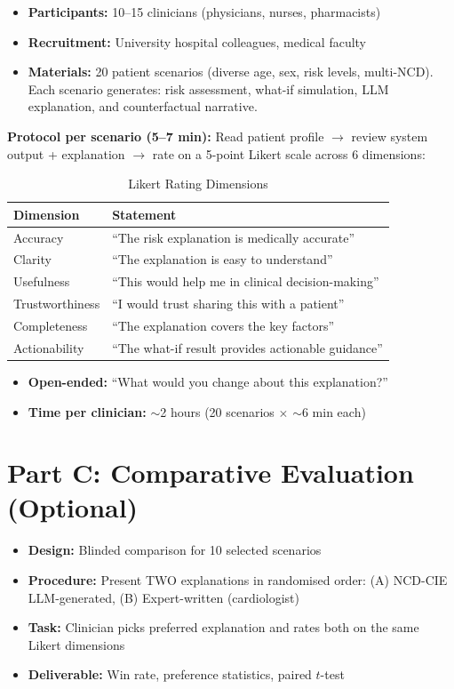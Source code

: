 \documentclass[runningheads,a4paper]{llncs}
\begin{document}
\begin{itemize}[leftmargin=*]
  \item \textbf{Participants:} 10--15 clinicians (physicians, nurses, pharmacists)
  \item \textbf{Recruitment:} University hospital colleagues, medical faculty
  \item \textbf{Materials:} 20 patient scenarios (diverse age, sex, risk levels, multi-NCD). Each scenario generates: risk assessment, what-if simulation, LLM explanation, and counterfactual narrative.
\end{itemize}

\noindent\textbf{Protocol per scenario (5--7 min):} Read patient profile $\rightarrow$ review system output + explanation $\rightarrow$ rate on a 5-point Likert scale across 6 dimensions:

\begin{table}[h]
\centering
\caption{Likert Rating Dimensions}
\begin{tabular}{ll}
\toprule
\textbf{Dimension} & \textbf{Statement} \\
\midrule
Accuracy & ``The risk explanation is medically accurate'' \\
Clarity & ``The explanation is easy to understand'' \\
Usefulness & ``This would help me in clinical decision-making'' \\
Trustworthiness & ``I would trust sharing this with a patient'' \\
Completeness & ``The explanation covers the key factors'' \\
Actionability & ``The what-if result provides actionable guidance'' \\
\bottomrule
\end{tabular}
\end{table}

\begin{itemize}[leftmargin=*]
  \item \textbf{Open-ended:} ``What would you change about this explanation?''
  \item \textbf{Time per clinician:} $\sim$2 hours (20 scenarios $\times$ $\sim$6 min each)
\end{itemize}

\section{Part C: Comparative Evaluation (Optional)}

\begin{itemize}[leftmargin=*]
  \item \textbf{Design:} Blinded comparison for 10 selected scenarios
  \item \textbf{Procedure:} Present TWO explanations in randomised order: (A) NCD-CIE LLM-generated, (B) Expert-written (cardiologist)
  \item \textbf{Task:} Clinician picks preferred explanation and rates both on the same Likert dimensions
  \item \textbf{Deliverable:} Win rate, preference statistics, paired $t$-test
\end{itemize}
\end{document}
